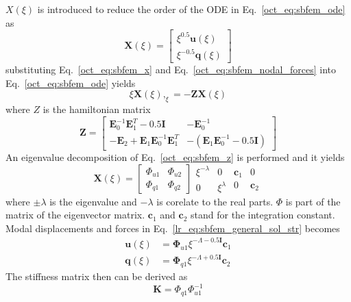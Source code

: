 %
$X(\xi)$ is introduced to reduce the order of the ODE in Eq.~\ref{oct_eq:sbfem_ode} as
\begin{equation}
    \mathbf{X} (\xi) =
    \begin{bmatrix}
        \xi^{0.5} \mathbf{u}(\xi) \\
        \xi^{-0.5} \mathbf{q}(\xi)
    \end{bmatrix}
\label{oct_eq:sbfem_x}
\end{equation}
%
substituting Eq.~\ref{oct_eq:sbfem_x} and Eq.~\ref{oct_eq:sbfem_nodal_forces} into Eq.~\ref{oct_eq:sbfem_ode} yields
\begin{equation}
    \xi \mathbf{X} (\xi),_\xi =
    -\mathbf{Z} \mathbf{X} (\xi)
\end{equation}
%
where $Z$ is the hamiltonian matrix
\begin{equation}
    \mathbf{Z} =
    \begin{bmatrix}
        \mathbf{E}_0^{-1} \mathbf{E}_1^T - 0.5 \mathbf{I}   &   -\mathbf{E}^{-1}_0 \\
        -\mathbf{E}_2 + \mathbf{E}_1 \mathbf{E}_0^{-1} \mathbf{E}_1^T   &   -(
            \mathbf{E}_1 \mathbf{E}_0^{-1} - 0.5 \mathbf{I}
        )
    \end{bmatrix}
\label{oct_eq:sbfem_z}
\end{equation}
%
An eigenvalue decomposition of Eq.~\ref{oct_eq:sbfem_z} is performed and it yields
\begin{equation}
    \mathbf{X} (\xi) =
    \begin{bmatrix}
        \Phi_{u1}   &   \Phi_{u2} \\
        \Phi_{q1}   &   \Phi_{q2}
    \end{bmatrix}
    \begin{matrix}
        \xi^{-\lambda}  &   0 \\
        0   &   \xi^{\lambda}
    \end{matrix}
    \begin{matrix}
        \mathbf{c}_1  &   0   \\
        0   &   \mathbf{c}_2
    \end{matrix}
\label{oct_eq:sbfem_eigenvalue}
\end{equation}
%
where $\pm\lambda$ is the eigenvalue and $-\lambda$ is corelate to the real parts.
$\Phi$ is part of the matrix of the eigenvector matrix.
$\mathbf{c}_1$ and $\mathbf{c}_2$ stand for the integration constant.
Modal displacements and forces in Eq.~\ref{lr_eq:sbfem_general_sol_str} becomes
\begin{subequations}
\begin{align}
    \mathbf{u}(\xi) &= \mathbf{\Phi}_{u1} \xi^{-\Lambda-0.5\mathbf{I}} \mathbf{c}_1
    \label{oct_eq:sbfem_general_sol_disp} \\
    \mathbf{q}(\xi) &= \mathbf{\Phi}_{q1} \xi^{-\Lambda+0.5\mathbf{I}} \mathbf{c}_2
    \label{oct_eq:sbfem_general_sol_str}
\end{align}
\end{subequations}
%
The stiffness matrix then can be derived as
\begin{equation}
    \mathbf{K} = \Phi_{q1} \Phi_{u1}^{-1}
\end{equation}